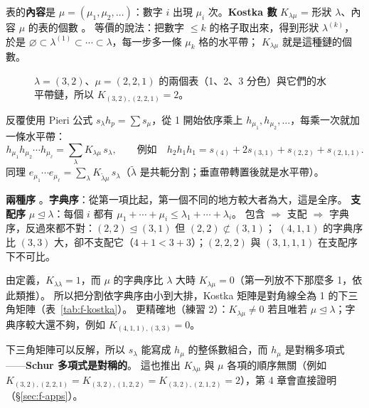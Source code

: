 表的\textbf{內容}是 $\mu=(\mu_1,\mu_2,\ldots)$：數字 $i$ 出現 $\mu_i$ 次。\textbf{Kostka 數} $K_{\lambda\mu}$ = 形狀 $\lambda$、內容 $\mu$ 的表的個數 。
等價的說法：把數字 $\le k$ 的格子取出來，得到形狀 $\lambda^{(k)}$，於是 $\varnothing\subset\lambda^{(1)}\subset\cdots\subset\lambda$，每一步多一條 $\mu_k$ 格的水平帶；
$K_{\lambda\mu}$ 就是這種鏈的個數。

\begin{figure}[H]
\centering
\FulKostkaTabs
\caption{$\lambda=(3,2)$、$\mu=(2,2,1)$ 的兩個表（\textcolor{cLeft}{1}、\textcolor{cB}{2}、\textcolor{cRight}{3} 分色）與它們的水平帶鏈，所以 $K_{(3,2),(2,2,1)}=2$。}
\label{fig:f-kostka-tabs}
\end{figure}

反覆使用 Pieri 公式 $s_\lambda h_p=\sum s_\mu$，從 1 開始依序乘上 $h_{\mu_1},h_{\mu_2},\ldots$，每乘一次就加一條水平帶：
\[
h_{\mu_1}h_{\mu_2}\cdots h_{\mu_\ell}=\sum_\lambda K_{\lambda\mu}\,s_\lambda ,\qquad\text{例如}\quad h_2h_1h_1=s_{(4)}+2s_{(3,1)}+s_{(2,2)}+s_{(2,1,1)} .
\]
同理 $e_{\mu_1}\cdots e_{\mu_\ell}=\sum_\lambda K_{\tilde\lambda\mu}\,s_\lambda$（$\tilde\lambda$ 是共軛分割；垂直帶轉置後就是水平帶）。

\textbf{兩種序} 。\textbf{字典序}：從第一項比起，第一個不同的地方較大者為大，這是全序。
\textbf{支配序} $\mu\trianglelefteq\lambda$：每個 $i$ 都有 $\mu_1+\cdots+\mu_i\le\lambda_1+\cdots+\lambda_i$。
包含 $\Rightarrow$ 支配 $\Rightarrow$ 字典序，反過來都不對：$(2,2)\trianglelefteq(3,1)$ 但 $(2,2)\not\subset(3,1)$；
$(4,1,1)$ 的字典序比 $(3,3)$ 大，卻不支配它（$4+1<3+3$）；$(2,2,2)$ 與 $(3,1,1,1)$ 在支配序下不可比。

由定義，$K_{\lambda\lambda}=1$，而 $\mu$ 的字典序比 $\lambda$ 大時 $K_{\lambda\mu}=0$（第一列放不下那麼多 1，依此類推）。
所以把分割依字典序由小到大排，Kostka 矩陣是對角線全為 1 的下三角矩陣（表~\ref{tab:f-kostka}）。
更精確地（練習 2）：$K_{\lambda\mu}\ne 0$ 若且唯若 $\mu\trianglelefteq\lambda$；字典序較大還不夠，例如 $K_{(4,1,1),(3,3)}=0$。

\begin{table}[H]
\centering
\FulKostkaMatrix
\caption{$n=4$ 的 Kostka 矩陣 $K_{\lambda\mu}$（列 $\lambda$、行 $\mu$，字典序由小到大）：下三角、對角線為 1。}
\label{tab:f-kostka}
\end{table}

下三角矩陣可以反解，所以 $s_\lambda$ 能寫成 $h_\mu$ 的整係數組合，而 $h_\mu$ 是對稱多項式——\textbf{Schur 多項式是對稱的}。
這也推出 $K_{\lambda\mu}$ 與 $\mu$ 各項的順序無關（例如 $K_{(3,2),(2,2,1)}=K_{(3,2),(1,2,2)}=K_{(3,2),(2,1,2)}=2$），第 4 章會直接證明（\S\ref{sec:f-apps}）。

